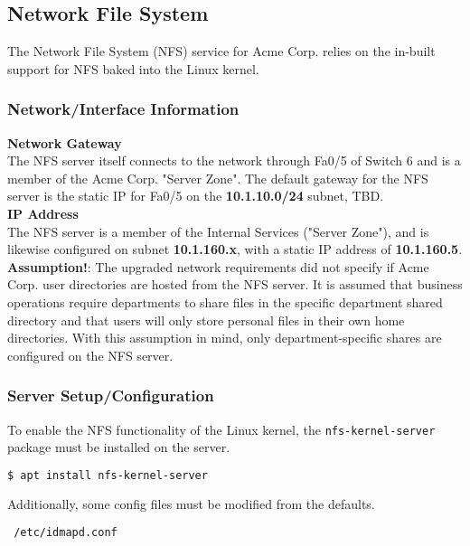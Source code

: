 \subsection{Network File System}
The Network File System (NFS) service for Acme Corp. relies on the in-built 
support for NFS baked into the Linux kernel. 

\subsubsection{Network/Interface Information}
\textbf{Network Gateway} \\
The NFS server itself connects to the network through Fa0/5 of Switch 6 and is 
a member of the Acme Corp. "Server Zone". The default gateway for the NFS 
server is the static IP for Fa0/5 on the \textbf{10.1.10.0/24} subnet, TBD. \\

\noindent
\textbf{IP Address} \\
The NFS server is a member of the Internal Services ("Server Zone"), and is
likewise configured on subnet \textbf{10.1.160.x}, with a static IP address of 
\textbf{10.1.160.5}. \\

\noindent
\textbf{Assumption!}: The upgraded network requirements did not specify if Acme 
Corp. user directories are hosted from the NFS server. It is assumed that
business operations require departments to share files in the specific
department shared directory and that users will only store personal files in
their own home directories. With this assumption in mind, only
department-specific shares are configured on the NFS server.

\subsubsection{Server Setup/Configuration}
To enable the NFS functionality of the Linux kernel, the
\lstinline$nfs-kernel-server$ package must be installed on the server.

\begin{lstlisting}[backgroundcolor=\color{Gray}, language=bash]
 $ apt install nfs-kernel-server
\end{lstlisting}
\vspace{1em}

\noindent
Additionally, some config files must be modified from the defaults. \\

\begin{lstlisting}
 /etc/idmapd.conf
\end{lstlisting}
\vspace{1em}

